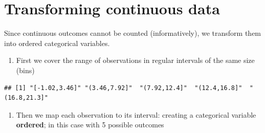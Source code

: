 \documentclass[
]{book}
\providecommand{\tightlist}{%
  \setlength{\itemsep}{0pt}\setlength{\parskip}{0pt}}
\begin{document}
\hypertarget{transforming-continuous-data}{%
\section{Transforming continuous data}\label{transforming-continuous-data}}

Since continuous outcomes cannot be counted (informatively), we transform them into ordered categorical variables.

\begin{enumerate}
\def\labelenumi{\arabic{enumi})}
\tightlist
\item
  First we cover the range of observations in regular intervals of the same size (bins)
\end{enumerate}

\begin{verbatim}
## [1] "[-1.02,3.46]" "(3.46,7.92]"  "(7.92,12.4]"  "(12.4,16.8]"  "(16.8,21.3]"
\end{verbatim}

\begin{enumerate}
\def\labelenumi{\arabic{enumi})}
\setcounter{enumi}{1}
\tightlist
\item
  Then we map each observation to its interval: creating a categorical variable \textbf{ordered}; in this case with 5 possible outcomes
\end{enumerate}
\end{document}
